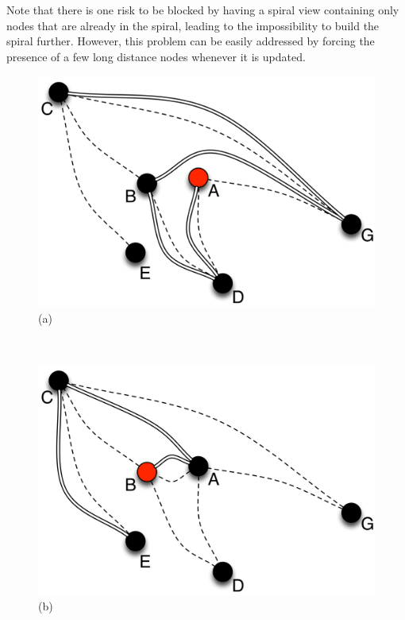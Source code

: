 Note that there is one risk to be blocked by having a spiral view containing only nodes
that are already in the spiral, leading to the impossibility to build the spiral
further. However, this problem can be easily addressed by forcing the presence of a few
long distance nodes whenever it is updated.

\begin{figure}[ht]
  {
    \begin{center}{
	\begin{minipage}{.3\linewidth}
	  \begin{center}
	    \includegraphics[width=1.05\linewidth]{Figures/learning1.png}\\(a)
	  \end{center}
	\end{minipage}
	~
	\begin{minipage}{.3\linewidth}
	  \begin{center}
	    \includegraphics[width=1.05\linewidth]{Figures/learning2.png}\\(b)

\end{center}
\end{minipage}}
\end{center}}
\end{figure}
